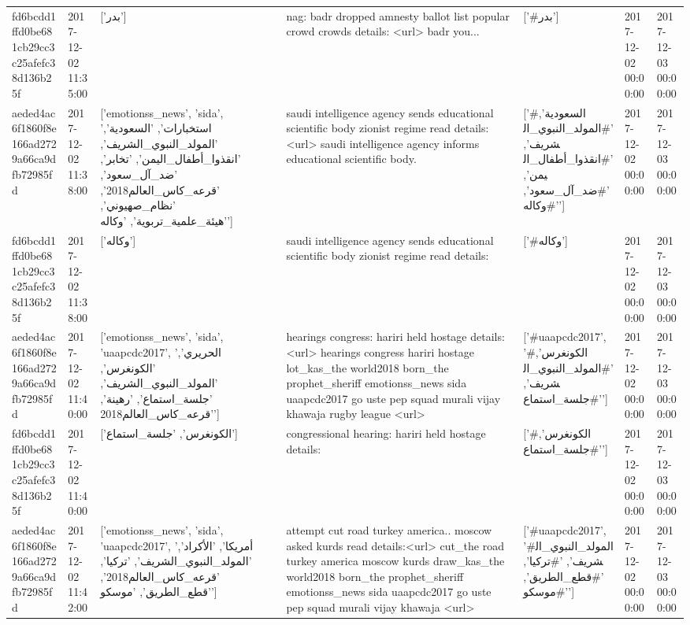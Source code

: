 \begin{tabular}{lllllll}
fd6bcdd1ffd0be681cb29cc3c25afefc38d136b25f & 2017-12-02 11:35:00 & ['بدر'] & nag: badr dropped amnesty ballot list popular crowd crowds details: <url> badr you... & ['#بدر'] & 2017-12-02 00:00:00 & 2017-12-03 00:00:00 \\
aeded4ac6f1860f8e166ad2729a66ca9dfb72985fd & 2017-12-02 11:38:00 & ['emotionss_news', 'sida', 'استخبارات', 'السعودية', 'المولد_النبوي_الشريف', 'انقذوا_أطفال_اليمن', 'تخابر', 'ضد_آل_سعود', 'قرعه_كاس_العالم2018', 'نظام_صهيوني', 'هيئة_علمية_تربوية', 'وكاله'] & saudi intelligence agency sends educational scientific body zionist regime read details:<url> saudi intelligence agency informs educational scientific body. & ['#السعودية', '#المولد_النبوي_الشريف', '#انقذوا_أطفال_اليمن', '#ضد_آل_سعود', '#وكاله'] & 2017-12-02 00:00:00 & 2017-12-03 00:00:00 \\
fd6bcdd1ffd0be681cb29cc3c25afefc38d136b25f & 2017-12-02 11:38:00 & ['وكاله'] & saudi intelligence agency sends educational scientific body zionist regime read details: & ['#وكاله'] & 2017-12-02 00:00:00 & 2017-12-03 00:00:00 \\
aeded4ac6f1860f8e166ad2729a66ca9dfb72985fd & 2017-12-02 11:40:00 & ['emotionss_news', 'sida', 'uaapcdc2017', 'الحريري', 'الكونغرس', 'المولد_النبوي_الشريف', 'جلسة_استماع', 'رهينة', 'قرعه_كاس_العالم2018'] & hearings congress: hariri held hostage details:<url> hearings congress hariri hostage lot\_kas\_the world2018 born\_the prophet\_sheriff emotionss\_news sida uaapcdc2017 go uste pep squad murali vijay khawaja rugby league <url> & ['#uaapcdc2017', '#الكونغرس', '#المولد_النبوي_الشريف', '#جلسة_استماع'] & 2017-12-02 00:00:00 & 2017-12-03 00:00:00 \\
fd6bcdd1ffd0be681cb29cc3c25afefc38d136b25f & 2017-12-02 11:40:00 & ['الكونغرس', 'جلسة_استماع'] & congressional hearing: hariri held hostage details: & ['#الكونغرس', '#جلسة_استماع'] & 2017-12-02 00:00:00 & 2017-12-03 00:00:00 \\
aeded4ac6f1860f8e166ad2729a66ca9dfb72985fd & 2017-12-02 11:42:00 & ['emotionss_news', 'sida', 'uaapcdc2017', 'أمريكا', 'الأكراد', 'المولد_النبوي_الشريف', 'تركيا', 'قرعه_كاس_العالم2018', 'قطع_الطريق', 'موسكو'] & attempt cut road turkey america.. moscow asked kurds read details:<url> cut\_the road turkey america moscow kurds draw\_kas\_the world2018 born\_the prophet\_sheriff emotionss\_news sida uaapcdc2017 go uste pep squad murali vijay khawaja <url> & ['#uaapcdc2017', '#المولد_النبوي_الشريف', '#تركيا', '#قطع_الطريق', '#موسكو'] & 2017-12-02 00:00:00 & 2017-12-03 00:00:00 \\

\end{tabular}
